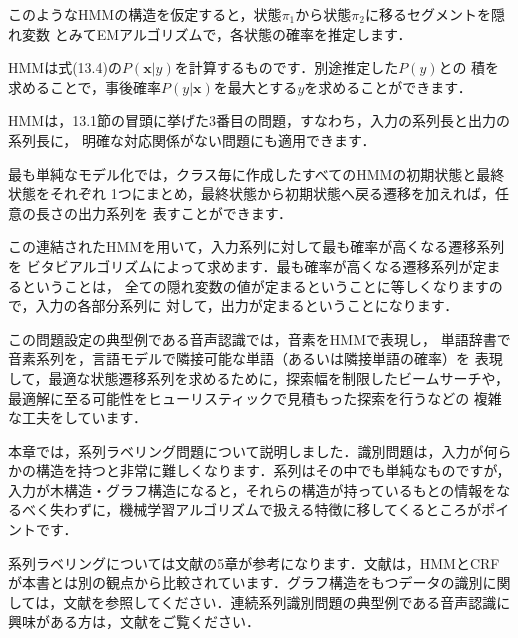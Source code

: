 このようなHMMの構造を仮定すると，状態$\pi_1$から状態$\pi_2$に移るセグメントを隠れ変数
とみてEMアルゴリズムで，各状態の確率を推定します．

HMMは式(13.4)の$P(\bm{x}|y)$を計算するものです．別途推定した$P(y)$との
積を求めることで，事後確率$P(y|\bm{x})$を最大とする$y$を求めることができます．

HMMは，13.1節の冒頭に挙げた3番目の問題，すなわち，入力の系列長と出力の系列長に，
明確な対応関係がない問題にも適用できます．

最も単純なモデル化では，クラス毎に作成したすべてのHMMの初期状態と最終状態をそれぞれ
1つにまとめ，最終状態から初期状態へ戻る遷移を加えれば，任意の長さの出力系列を
表すことができます．


この連結されたHMMを用いて，入力系列に対して最も確率が高くなる遷移系列を
ビタビアルゴリズムによって求めます．最も確率が高くなる遷移系列が定まるということは，
全ての隠れ変数の値が定まるということに等しくなりますので，入力の各部分系列に
対して，出力が定まるということになります．


この問題設定の典型例である音声認識では，音素をHMMで表現し，
単語辞書で音素系列を，言語モデルで隣接可能な単語（あるいは隣接単語の確率）を
表現して，最適な状態遷移系列を求めるために，探索幅を制限したビームサーチや，
最適解に至る可能性をヒューリスティックで見積もった探索を行うなどの
複雑な工夫をしています．

本章では，系列ラベリング問題について説明しました．識別問題は，入力が何らかの構造を持つと非常に難しくなります．系列はその中でも単純なものですが，入力が木構造・グラフ構造になると，それらの構造が持っているもとの情報をなるべく失わずに，機械学習アルゴリズムで扱える特徴に移してくるところがポイントです．

系列ラベリングについては文献\cite{takamura10}の5章が参考になります．文献\cite{tsuboi06}は，HMMとCRFが本書とは別の観点から比較されています．グラフ構造をもつデータの識別に関しては，文献\cite{kashima10}を参照してください．連続系列識別問題の典型例である音声認識に興味がある方は，文献\cite{araki07}をご覧ください．
